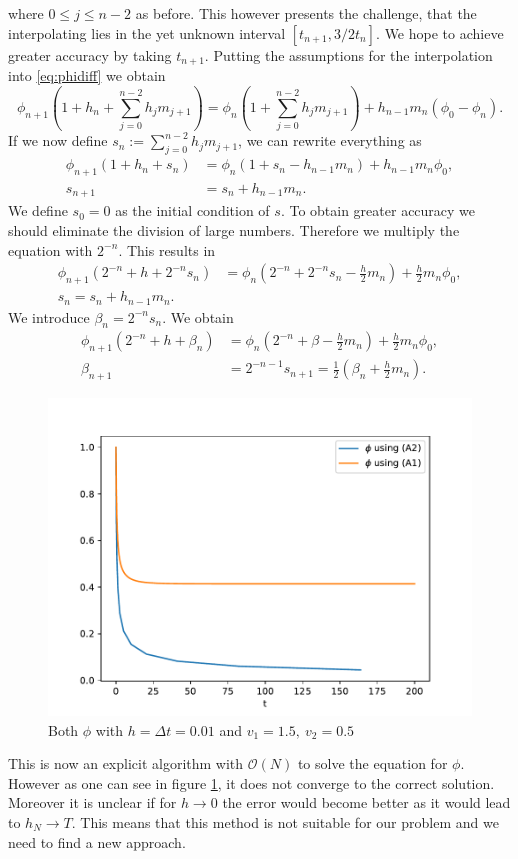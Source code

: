 \documentclass[12pt,a4paper,twoside, open=right]{scrreprt}
\theoremstyle{definition}
\theoremstyle{plain}
\begin{document}
where $0\le j\le n-2$ as before. This however presents the challenge, that the interpolating lies in the yet unknown interval $[t_{n+1},3/2t_{n}]$. We hope to achieve greater accuracy by taking $t_{n+1}$. Putting the assumptions for the interpolation into \eqref{eq:phidiff} we obtain
\begin{equation}
    \phi_{n+1}(1 + h_n + \sum_{j=0}^{n-2}h_jm_{j+1})=\phi_n(1+\sum_{j=0}^{n-2}h_jm_{j+1})+h_{n-1}m_n(\phi_0-\phi_n).
\end{equation}
If we now define $s_n:=\sum_{j=0}^{n-2}h_jm_{j+1}$, we can rewrite everything as
\begin{align}
    \phi_{n+1}(1+h_n+s_n)&=\phi_n(1+s_n-h_{n-1}m_n)+h_{n-1}m_n\phi_0,\\
    s_{n+1}&=s_n+h_{n-1}m_n.
\end{align}
We define $s_0=0$ as the initial condition of $s$. To obtain greater accuracy we should eliminate the division of large numbers. Therefore we multiply the equation with $2^{-n}$. This results in
\begin{align}
    \phi_{n+1}(2^{-n}+h+2^{-n}s_n) &= \phi_n(2^{-n}+2^{-n}s_n-\frac{h}{2}m_n)+\frac{h}{2}m_n\phi_0,\\
    s_n=s_n+h_{n-1}m_n.
\end{align}
We introduce $\beta_n=2^{-n}s_n$. We obtain
\begin{align}
     \phi_{n+1}(2^{-n}+h+\beta_n) &= \phi_n(2^{-n}+\beta-\frac{h}{2}m_n)+\frac{h}{2}m_n\phi_0,\\
     \beta_{n+1} &= 2^{-n-1}s_{n+1}=\frac{1}{2}(\beta_n+\frac{h}{2}m_n) .
\end{align}
\begin{figure}
    \centering
    \includegraphics[width=\textwidth]{Phidiff}
    \caption{Both $\phi$ with $h=\Delta t=0.01$ and $v_1=1.5,~v_2=0.5$}
    \label{fig:phifalse}
\end{figure}
This is now an explicit algorithm with $\mathcal{O}(N)$ to solve the equation for $\phi$. However as one can see in figure \ref{fig:phifalse}, it does not converge to the correct solution. Moreover it is unclear if for $h\to 0$ the error would become better as it would lead to $h_N\to T$. This means that this method is not suitable for our problem and we need to find a new approach.
\end{document}
